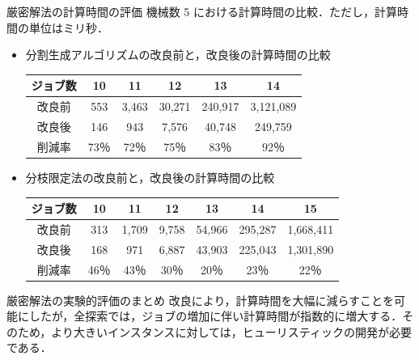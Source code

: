 \documentclass[dvipdfmx]{beamer}
\begin{document}
    \begin{frame}{厳密解法の計算時間の評価}
      機械数 5 における計算時間の比較．ただし，計算時間の単位はミリ秒．
      \begin{itemize}
        \item 分割生成アルゴリズムの改良前と，改良後の計算時間の比較
        \begin{tabular}{|c|c|c|c|c|c|} \hline
          ジョブ数 & 10 & 11 & 12 & 13 & 14 \\ \hline \hline
          改良前 & 553 & 3,463 & 30,271 & 240,917 & 3,121,089 \\ \hline
          改良後 & 146 & 943 & 7,576 & 40,748 & 249,759  \\ \hline
          削減率 & 73％ & 72％ & 75％ & 83％ & \alert{92％} \\ \hline
        \end{tabular}
        \item 分枝限定法の改良前と，改良後の計算時間の比較
        \begin{tabular}{|c|c|c|c|c|c|c|} \hline
          ジョブ数 & 10 & 11 & 12 & 13 & 14 & 15\\ \hline \hline
          改良前 & 313 & 1,709 & 9,758 & 54,966 & 295,287 & 1,668,411 \\ \hline
          改良後 & 168 & 971 & 6,887 & 43,903 & 225,043 & 1,301,890 \\ \hline
          削減率 & 46％ & 43％ & 30％ & 20％ & 23％ & 22％\\ \hline
        \end{tabular}
      \end{itemize}
      \begin{alertblock}{厳密解法の実験的評価のまとめ}
        改良により，計算時間を大幅に減らすことを可能にしたが，全探索では，ジョブの増加に伴い計算時間が指数的に増大する．そのため，より大きいインスタンスに対しては，ヒューリスティックの開発が必要である．
      \end{alertblock}
    \end{frame}
\end{document}
